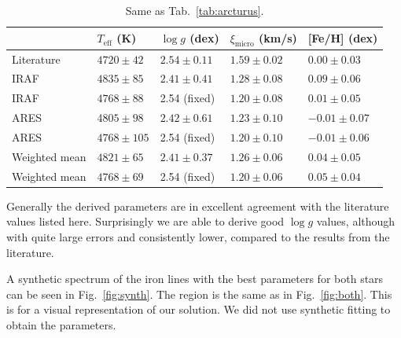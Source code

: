 \documentclass{aa}
\begin{document}
\begin{table}[htb!]
    \caption{Same as Tab.~\ref{tab:arcturus}.}
    \label{tab:10Leo}
    \centering
    \begin{tabular}{lllll}
      \hline\hline
                     & $T_\mathrm{eff}$ (K) &  $\log g$ (dex)  &   $\xi_\mathrm{micro}$ (km/s)   & [Fe/H] (dex)     \\
      \hline
        Literature   & $4720 \pm  42$       &  $2.54 \pm 0.11$ &    $1.59 \pm 0.02$              & $ 0.00 \pm 0.03$ \\
      \hline
        IRAF         & $4835 \pm  85$       &  $2.41 \pm 0.41$ &    $1.28 \pm 0.08$              & $ 0.09 \pm 0.06$ \\
        IRAF         & $4768 \pm  88$       &   2.54 (fixed)   &    $1.20 \pm 0.08$              & $ 0.01 \pm 0.05$ \\
      \hline
        ARES         & $4805 \pm  98$       &  $2.42 \pm 0.61$ &    $1.23 \pm 0.10$              & $-0.01 \pm 0.07$ \\
        ARES         & $4768 \pm 105$       &   2.54 (fixed)   &    $1.20 \pm 0.10$              & $-0.01 \pm 0.06$ \\
      \hline
        Weighted mean& $4821 \pm  65$       &  $2.41 \pm 0.37$ &    $1.26 \pm 0.06$              & $ 0.04 \pm 0.05$ \\
        Weighted mean& $4768 \pm  69$       &   2.54 (fixed)   &    $1.20 \pm 0.06$              & $ 0.05 \pm 0.04$ \\
      \hline
    \end{tabular}
\end{table}

Generally the derived parameters are in excellent agreement with the literature
values listed here. Surprisingly we are able to derive good $\log g$ values,
although with quite large errors and consistently lower, compared to the results
from the literature.

A synthetic spectrum of the iron lines with the best parameters for both stars
can be seen in Fig.~\ref{fig:synth}. The region is the same as in
Fig.~\ref{fig:both}. This is for a visual representation of our solution. We did
not use synthetic fitting to obtain the parameters.
\end{document}
